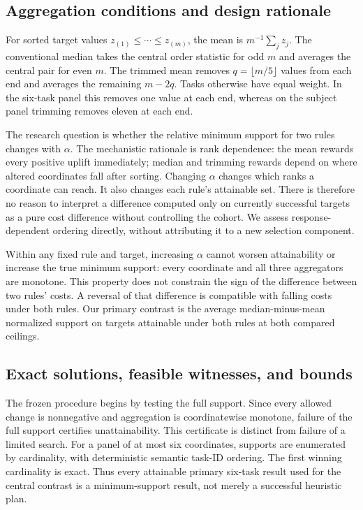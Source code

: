 \documentclass{article}
\begin{document}
\subsection{Aggregation conditions and design rationale}
For sorted target values $z_{(1)}\le\cdots\le z_{(m)}$, the mean is $m^{-1}\sum_j z_j$. The conventional median takes the central order statistic for odd $m$ and averages the central pair for even $m$. The trimmed mean removes $q=\lfloor m/5\rfloor$ values from each end and averages the remaining $m-2q$. Tasks otherwise have equal weight. In the six-task panel this removes one value at each end, whereas on the subject panel trimming removes eleven at each end.

The research question is whether the relative minimum support for two rules changes with $\alpha$. The mechanistic rationale is rank dependence: the mean rewards every positive uplift immediately; median and trimming rewards depend on where altered coordinates fall after sorting. Changing $\alpha$ changes which ranks a coordinate can reach. It also changes each rule's attainable set. There is therefore no reason to interpret a difference computed only on currently successful targets as a pure cost difference without controlling the cohort. We assess response-dependent ordering directly, without attributing it to a new selection component.

Within any fixed rule and target, increasing $\alpha$ cannot worsen attainability or increase the true minimum support: every coordinate and all three aggregators are monotone. This property does not constrain the sign of the difference between two rules' costs. A reversal of that difference is compatible with falling costs under both rules. Our primary contrast is the average median-minus-mean normalized support on targets attainable under both rules at both compared ceilings.

\subsection{Exact solutions, feasible witnesses, and bounds}
The frozen procedure begins by testing the full support. Since every allowed change is nonnegative and aggregation is coordinatewise monotone, failure of the full support certifies unattainability. This certificate is distinct from failure of a limited search. For a panel of at most six coordinates, supports are enumerated by cardinality, with deterministic semantic task-ID ordering. The first winning cardinality is exact. Thus every attainable primary six-task result used for the central contrast is a minimum-support result, not merely a successful heuristic plan.
\end{document}
